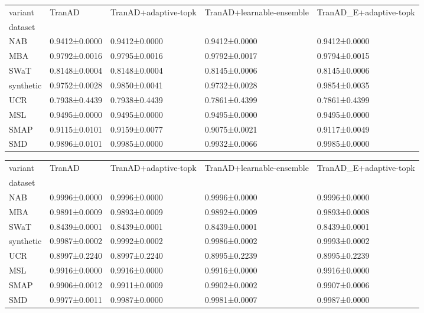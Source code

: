 \begin{tabular}{lllll}
\toprule
variant & TranAD & TranAD+adaptive-topk & TranAD+learnable-ensemble & TranAD_E+adaptive-topk \\
dataset &  &  &  &  \\
\midrule
NAB & 0.9412±0.0000 & 0.9412±0.0000 & 0.9412±0.0000 & 0.9412±0.0000 \\
MBA & 0.9792±0.0016 & 0.9795±0.0016 & 0.9792±0.0017 & 0.9794±0.0015 \\
SWaT & 0.8148±0.0004 & 0.8148±0.0004 & 0.8145±0.0006 & 0.8145±0.0006 \\
synthetic & 0.9752±0.0028 & 0.9850±0.0041 & 0.9732±0.0028 & 0.9854±0.0035 \\
UCR & 0.7938±0.4439 & 0.7938±0.4439 & 0.7861±0.4399 & 0.7861±0.4399 \\
MSL & 0.9495±0.0000 & 0.9495±0.0000 & 0.9495±0.0000 & 0.9495±0.0000 \\
SMAP & 0.9115±0.0101 & 0.9159±0.0077 & 0.9075±0.0021 & 0.9117±0.0049 \\
SMD & 0.9896±0.0101 & 0.9985±0.0000 & 0.9932±0.0066 & 0.9985±0.0000 \\
\bottomrule
\end{tabular}

\begin{tabular}{lllll}
\toprule
variant & TranAD & TranAD+adaptive-topk & TranAD+learnable-ensemble & TranAD_E+adaptive-topk \\
dataset &  &  &  &  \\
\midrule
NAB & 0.9996±0.0000 & 0.9996±0.0000 & 0.9996±0.0000 & 0.9996±0.0000 \\
MBA & 0.9891±0.0009 & 0.9893±0.0009 & 0.9892±0.0009 & 0.9893±0.0008 \\
SWaT & 0.8439±0.0001 & 0.8439±0.0001 & 0.8439±0.0001 & 0.8439±0.0001 \\
synthetic & 0.9987±0.0002 & 0.9992±0.0002 & 0.9986±0.0002 & 0.9993±0.0002 \\
UCR & 0.8997±0.2240 & 0.8997±0.2240 & 0.8995±0.2239 & 0.8995±0.2239 \\
MSL & 0.9916±0.0000 & 0.9916±0.0000 & 0.9916±0.0000 & 0.9916±0.0000 \\
SMAP & 0.9906±0.0012 & 0.9911±0.0009 & 0.9902±0.0002 & 0.9907±0.0006 \\
SMD & 0.9977±0.0011 & 0.9987±0.0000 & 0.9981±0.0007 & 0.9987±0.0000 \\
\bottomrule
\end{tabular}

